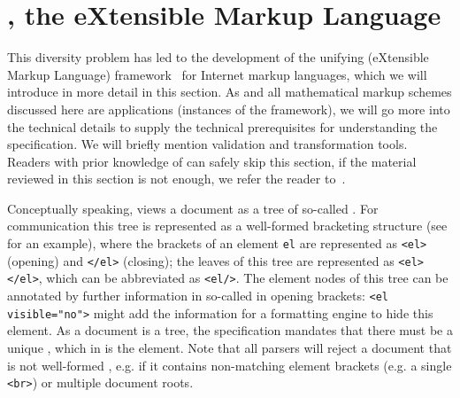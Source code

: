 \section{{\else{\xml}\fi}, the eXtensible Markup Language}\label{sec:xml}

This diversity problem has led to the development of the unifying
{\xml}{} (eXtensible Markup Language)
framework~\cite{bray:XML97} for Internet markup languages, which we will introduce
in more detail in this section. As {\omdoc} and all mathematical markup schemes
discussed here are {\xml} applications (instances of the {\xml}
framework), we will go
more into the technical details to supply the technical prerequisites for
understanding the specification. We will briefly mention {\xml} validation and
transformation tools. Readers with prior knowledge of {\xml} can safely skip this
section, if the material reviewed in this section is not enough, we refer the
reader to~\cite{Harold:xb01}.

Conceptually speaking, {\xml} views a document as a tree of so-called {}.  For communication
this tree is represented as a well-formed bracketing structure (see
{} for an example), where the brackets of an element
{\tt{el}} are represented as {\tt{<el>}} (opening) and {\tt{</el>}} (closing); the
leaves of this tree are represented as {} {\tt<el></el>}, which can be abbreviated as
{\tt<el/>}. The element nodes of this
tree can be annotated by further information in so-called {} in
opening brackets: {\tt<el visible="no">} might add the information for a
formatting engine to hide this element. As a document is a tree, the {\xml}
specification mandates that there must be a unique {}, which
in {\omdoc} is the {} element.  Note that all {\xml} parsers will
reject a document that is not well-formed {\xml}, e.g. if it contains non-matching
element brackets (e.g. a single {\tt{<br>}}) or multiple document roots.

